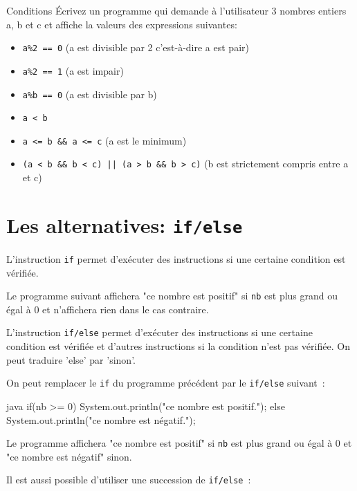 \documentclass[a4paper,11pt]{article}
\begin{document}
	\begin{Exercice}{Conditions}
		\'Ecrivez un programme qui demande à l'utilisateur 
		3 nombres entiers a, b et c et affiche la valeurs des expressions suivantes:
		\begin{itemize}
			\item \texttt{a\%2 == 0}  (a est divisible par 2 c'est-à-dire a est pair)
			\item \texttt{a\%2 == 1}  (a est impair)
			\item \texttt{a\%b == 0}  (a est divisible par b)
			\item \texttt{a < b}
			\item \texttt{a <= b \&\& a <= c} (a est le minimum)
			\item \texttt{(a < b \&\& b < c) || (a > b \&\& b > c)} (b est strictement compris entre a et c)
		\end{itemize}
	\end{Exercice}


\section{Les alternatives: \texttt{if/else}}

	L'instruction \texttt{if} permet d'exécuter des instructions si une certaine condition est vérifiée.
	
	Le programme suivant affichera "ce nombre est positif" 
	si \texttt{nb} est plus grand ou égal à 0 et n'affichera rien dans le cas contraire.
	 

	L'instruction \texttt{if/else} permet d'exécuter des instructions si une certaine condition est vérifiée
	et d'autres instructions si la condition n'est pas vérifiée. On peut traduire 'else' par 'sinon'.
	
	On peut remplacer le \texttt{if} du programme précédent par le \texttt{if/else} suivant~:
	
	\begin{Code}{java}
		if(nb >= 0) {
			System.out.println("ce nombre est positif.");
		} else {
			System.out.println("ce nombre est négatif.");
		}
	\end{Code}

	Le programme affichera "ce nombre est positif" 
	si \texttt{nb} est plus grand ou égal à 0 et "ce nombre est négatif" sinon.


	Il est aussi possible d'utiliser une succession de \texttt{if/else}~:
		
\end{document}
